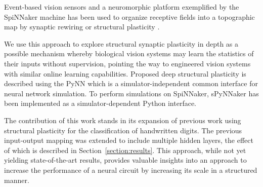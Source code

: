 \documentclass[letterpaper, 10 pt, conference]{ieeeconf}  %
\begin{document}
Event-based vision sensors \cite{gray1989oscillatory} and a neuromorphic platform exemplified by the SpiNNaker machine \cite{Furber2020} has been used to organize receptive fields into a topographic map by synaptic rewiring or structural plasticity \cite{bogdan2018structural,hopkins2018spiking}.

We use this approach to explore structural synaptic plasticity in depth as a possible mechanism whereby biological vision systems may learn the statistics of their inputs without supervision, pointing the way to engineered vision systems with similar online learning capabilities.
Proposed deep structural plasticity is described using the PyNN \cite{davison2009pynn} which is a simulator-independent common interface for neural network simulation. 
To perform simulations on SpiNNaker,  sPyNNaker \cite{rhodes2018spynnaker} has been implemented as a simulator-dependent Python interface. 

The contribution of this work stands in its expansion of previous work using structural plasticity for the classification of handwritten digits. The previous input-output mapping was extended to include multiple hidden layers, the effect of which is described in Section~\ref{section:results}. This approach, while not yet yielding state-of-the-art results, provides valuable insights into an approach to increase the performance of a neural circuit by increasing its scale in a structured manner.


\end{document}

